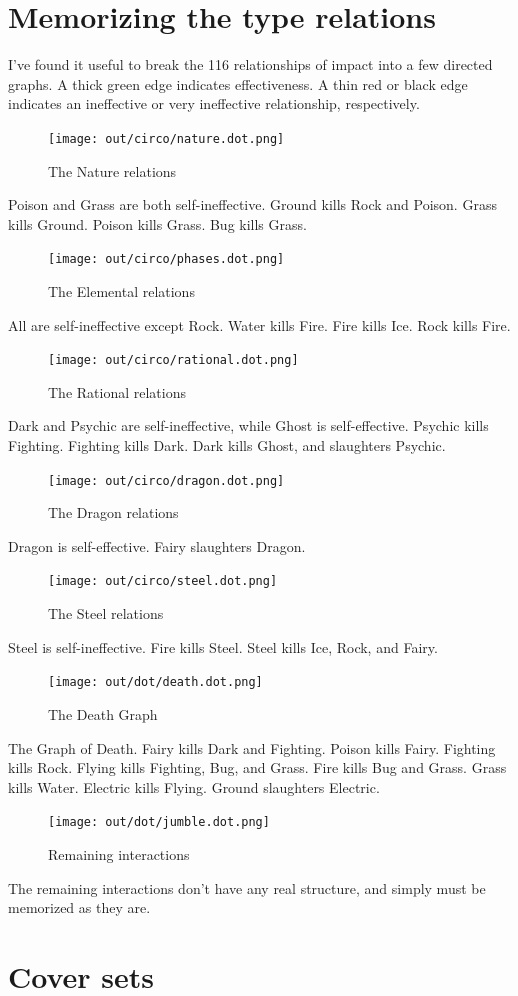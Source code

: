 \section{Memorizing the type relations}
I've found it useful to break the 116 relationships of impact into a few directed graphs.
A thick green edge indicates effectiveness.
A thin red or black edge indicates an ineffective or very ineffective relationship, respectively.

\begin{figure}[h]
\centering
\texttt{[image: out/circo/nature.dot.png]}
\caption{The Nature relations}
\end{figure}
Poison and Grass are both self-ineffective.
Ground kills Rock and Poison.
Grass kills Ground.
Poison kills Grass.
Bug kills Grass.

\begin{figure}[h]
\centering
\texttt{[image: out/circo/phases.dot.png]}
\caption{The Elemental relations}
\end{figure}
All are self-ineffective except Rock.
Water kills Fire.
Fire kills Ice.
Rock kills Fire.

\begin{figure}[h]
\centering
\texttt{[image: out/circo/rational.dot.png]}
\caption{The Rational relations}
\end{figure}
Dark and Psychic are self-ineffective, while Ghost is self-effective.
Psychic kills Fighting.
Fighting kills Dark.
Dark kills Ghost, and slaughters Psychic.

\begin{figure}
\centering
\texttt{[image: out/circo/dragon.dot.png]}
\caption{The Dragon relations}
\end{figure}
Dragon is self-effective.
Fairy slaughters Dragon.

\begin{figure}
\centering
\texttt{[image: out/circo/steel.dot.png]}
\caption{The Steel relations}
\end{figure}
Steel is self-ineffective.
Fire kills Steel.
Steel kills Ice, Rock, and Fairy.

\begin{figure}[h]
\centering
\texttt{[image: out/dot/death.dot.png]}
\caption{The Death Graph}
\end{figure}
The Graph of Death.
Fairy kills Dark and Fighting.
Poison kills Fairy.
Fighting kills Rock.
Flying kills Fighting, Bug, and Grass.
Fire kills Bug and Grass.
Grass kills Water.
Electric kills Flying.
Ground slaughters Electric.

\begin{figure}[h]
\centering
\texttt{[image: out/dot/jumble.dot.png]}
\caption{Remaining interactions}
\end{figure}
The remaining interactions don't have any real structure, and simply must be
memorized as they are.

\section{Cover sets}

